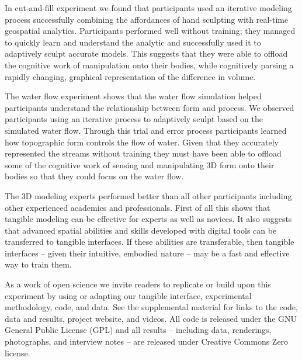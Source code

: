 \documentclass[Afour,sagev,times]{sagej} %
\begin{document}
In cut-and-fill experiment we found that
participants used an iterative modeling process
successfully combining the affordances of hand sculpting
with real-time geospatial analytics. 
Participants performed well without training; 
they managed to quickly learn and 
understand the analytic
and successfully used it to adaptively sculpt
accurate models.
This suggests that they were able to offload the cognitive work 
of manipulation onto their bodies, while cognitively 
parsing a rapidly changing, graphical representation 
of the difference in volume.

The water flow experiment shows 
that the water flow simulation helped participants 
understand the relationship between form and process.
We observed participants using an iterative process
to adaptively sculpt based on the simulated water flow. 
Through this trial and error process 
participants learned how
topographic form controls the flow of water.
Given that they accurately represented the streams without training
they must have been able to offload 
some of the cognitive work of sensing and manipulating 
3D form onto their bodies so that 
they could focus on the water flow. 

The 3D modeling experts 
performed better than all other participants
including other experienced academics and professionals. 
First of all this shows that 
tangible modeling
can be effective for experts as well as novices. 
It also suggests that advanced spatial abilities and skills
developed with digital tools can be transferred
to tangible interfaces. 
If these abilities are transferable, 
then tangible interfaces 
-- given their intuitive, embodied nature --
may be a fast and effective way to train them.


As a work of open science we invite readers to
replicate or build upon this experiment by 
using or adapting our tangible interface, 
experimental methodology, code, and data. 
%
See the supplemental material 
for links to the
code,
data and results, 
project website,
and videos.
%
All code is released under the GNU General Public License (GPL)
and all results  
-- including data, renderings, photographs, and interview notes --
are released under Creative Commons Zero license.
\end{document}
